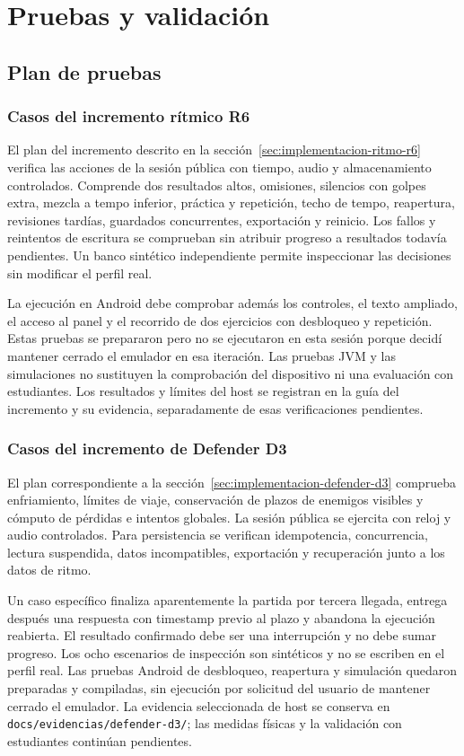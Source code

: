 \chapter{Pruebas y validación}
\label{cap:pruebas}
\section{Plan de pruebas}
\subsection{Casos del incremento rítmico R6}
El plan del incremento descrito en la sección~\ref{sec:implementacion-ritmo-r6}
verifica las acciones de la sesión pública con tiempo, audio y almacenamiento
controlados. Comprende dos resultados altos, omisiones, silencios con golpes
extra, mezcla a tempo inferior, práctica y repetición, techo de tempo,
reapertura, revisiones tardías, guardados concurrentes, exportación y reinicio.
Los fallos y reintentos de escritura se comprueban sin atribuir progreso a
resultados todavía pendientes. Un banco sintético independiente permite
inspeccionar las decisiones sin modificar el perfil real.

La ejecución en Android debe comprobar además los controles, el texto
ampliado, el acceso al panel y el recorrido de dos ejercicios con desbloqueo
y repetición. Estas pruebas se prepararon pero no se ejecutaron en esta sesión
porque decidí mantener cerrado el emulador en esa iteración. Las pruebas JVM y las
simulaciones no sustituyen la comprobación del dispositivo ni una evaluación
con estudiantes. Los resultados y límites del host se registran en la guía
del incremento y su evidencia, separadamente de esas verificaciones pendientes.
\subsection{Casos del incremento de Defender D3}
El plan correspondiente a la sección~\ref{sec:implementacion-defender-d3}
comprueba enfriamiento, límites de viaje, conservación de plazos de enemigos
visibles y cómputo de pérdidas e intentos globales. La sesión pública se
ejercita con reloj y audio controlados. Para persistencia se verifican
idempotencia, concurrencia, lectura suspendida, datos incompatibles,
exportación y recuperación junto a los datos de ritmo.

Un caso específico finaliza aparentemente la partida por tercera llegada,
entrega después una respuesta con timestamp previo al plazo y abandona la
ejecución reabierta. El resultado confirmado debe ser una interrupción y no
debe sumar progreso. Los ocho escenarios de inspección son sintéticos y no
se escriben en el perfil real. Las pruebas Android de desbloqueo, reapertura
y simulación quedaron preparadas y compiladas, sin ejecución por solicitud
del usuario de mantener cerrado el emulador. La evidencia seleccionada de host
se conserva en \texttt{docs/evidencias/defender-d3/}; las medidas físicas y la
validación con estudiantes continúan pendientes.
